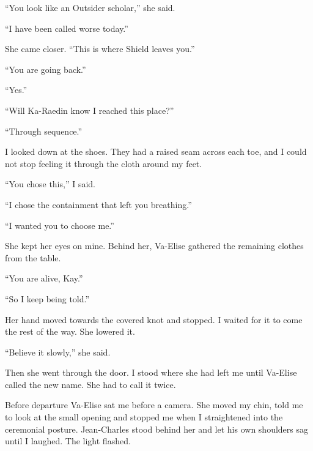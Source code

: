 ``You look like an Outsider scholar,'' she said.\par

``I have been called worse today.''\par

She came closer. ``This is where Shield leaves you.''\par

``You are going back.''\par

``Yes.''\par

``Will Ka-Raedin know I reached this place?''\par

``Through sequence.''\par

I looked down at the shoes. They had a raised seam across each toe, and I could not stop feeling it through the cloth around my feet.\par

``You chose this,'' I said.\par

``I chose the containment that left you breathing.''\par

``I wanted you to choose me.''\par

She kept her eyes on mine. Behind her, Va-Elise gathered the remaining clothes from the table.\par

``You are alive, Kay.''\par

``So I keep being told.''\par

Her hand moved towards the covered knot and stopped. I waited for it to come the rest of the way. She lowered it.\par

``Believe it slowly,'' she said.\par

Then she went through the door. I stood where she had left me until Va-Elise called the new name. She had to call it twice.\par

\ornament

Before departure Va-Elise sat me before a camera. She moved my chin, told me to look at the small opening and stopped me when I straightened into the ceremonial posture. Jean-Charles stood behind her and let his own shoulders sag until I laughed. The light flashed.\par

